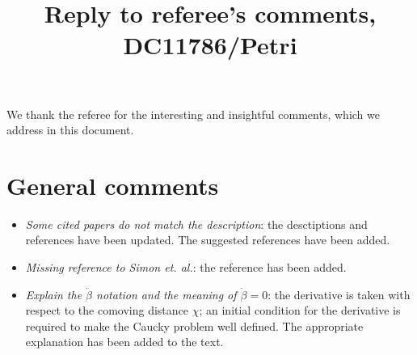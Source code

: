 \documentclass[11pt]{article}
\begin{document}
\title{Reply to referee's comments, DC11786/Petri}
\author{}
\date{}

\maketitle

\noindent
We thank the referee for the interesting and insightful comments, which we address in this document.

\section*{General comments}

\begin{itemize}
\item \textit{Some cited papers do not match the description}: the desctiptions and references have been updated. The suggested references have been added.
\item \textit{Missing reference to Simon et. al.}: the reference has been added.
\item \textit{Explain the $\dot{\beta}$ notation and the meaning of $\dot{\beta}=0$}: the derivative is taken with respect to the comoving distance $\chi$; an initial condition for the derivative is required to make the Caucky problem well defined. The appropriate explanation has been added to the text.


\end{itemize}
\end{document}
